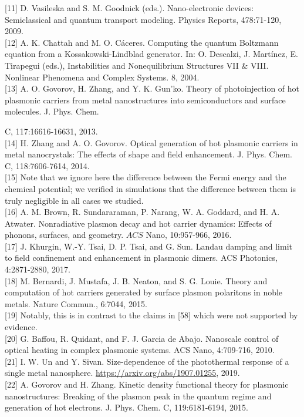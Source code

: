 \documentclass[10pt]{article}
\begin{document}
[11] D. Vasileska and S. M. Goodnick (eds.). Nano-electronic devices: Semiclassical and quantum transport modeling. Physics Reports, 478:71-120, 2009.\\[0pt]
[12] A. K. Chattah and M. O. Cáceres. Computing the quantum Boltzmann equation from a Kossakowski-Lindblad generator. In: O. Descalzi, J. Martínez, E. Tirapegui (eds.), Instabilities and Nonequilibrium Structures VII \& VIII. Nonlinear Phenomena and Complex Systems. 8, 2004.\\[0pt]
[13] A. O. Govorov, H. Zhang, and Y. K. Gun'ko. Theory of photoinjection of hot plasmonic carriers from metal nanostructures into semiconductors and surface molecules. J. Phys. Chem.

C, 117:16616-16631, 2013.\\[0pt]
[14] H. Zhang and A. O. Govorov. Optical generation of hot plasmonic carriers in metal nanocrystals: The effects of shape and field enhancement. J. Phys. Chem. C, 118:7606-7614, 2014.\\[0pt]
[15] Note that we ignore here the difference between the Fermi energy and the chemical potential; we verified in simulations that the difference between them is truly negligible in all cases we studied.\\[0pt]
[16] A. M. Brown, R. Sundararaman, P. Narang, W. A. Goddard, and H. A. Atwater. Nonradiative plasmon decay and hot carrier dynamics: Effects of phonons, surfaces, and geometry. $A C S$ Nano, 10:957-966, 2016.\\[0pt]
[17] J. Khurgin, W.-Y. Tsai, D. P. Tsai, and G. Sun. Landau damping and limit to field confinement and enhancement in plasmonic dimers. ACS Photonics, 4:2871-2880, 2017.\\[0pt]
[18] M. Bernardi, J. Mustafa, J. B. Neaton, and S. G. Louie. Theory and computation of hot carriers generated by surface plasmon polaritons in noble metals. Nature Commun., 6:7044, 2015.\\[0pt]
[19] Notably, this is in contrast to the claims in [58] which were not supported by evidence.\\[0pt]
[20] G. Baffou, R. Quidant, and F. J. Garcia de Abajo. Nanoscale control of optical heating in complex plasmonic systems. ACS Nano, 4:709-716, 2010.\\[0pt]
[21] I. W. Un and Y. Sivan. Size-dependence of the photothermal response of a single metal nanosphere. \href{https://arxiv.org/abs/1907.01255}{https://arxiv.org/abs/1907.01255}, 2019.\\[0pt]
[22] A. Govorov and H. Zhang. Kinetic density functional theory for plasmonic nanostructures: Breaking of the plasmon peak in the quantum regime and generation of hot electrons. J. Phys. Chem. C, 119:6181-6194, 2015.\\[0pt]
\end{document}
